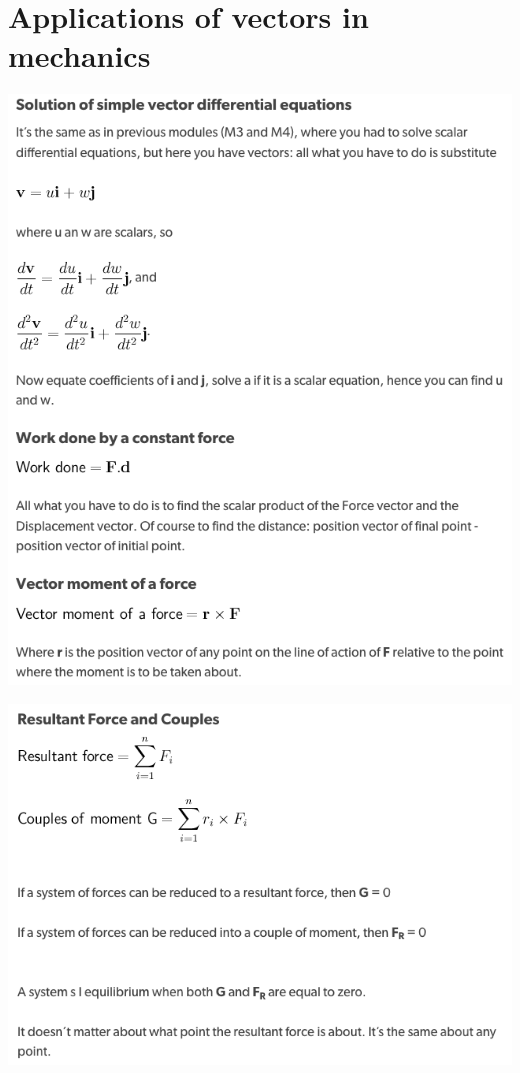 \documentclass[a4paper]{article}
\begin{document}
\section{Applications of vectors in mechanics}
\begin{center}
    \includegraphics[scale=0.5]{img_M/21_eg1}
\end{center}
\begin{center}
    \includegraphics[scale=0.5]{img_M/21_eg2}
\end{center}
\end{document}
